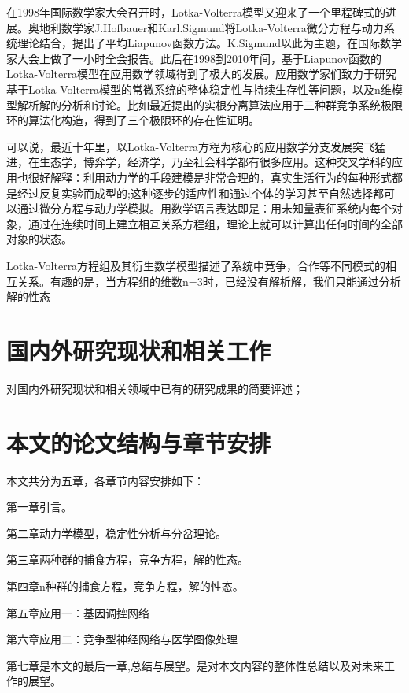 在1998年国际数学家大会召开时，Lotka-Volterra模型又迎来了一个里程碑式的进展。奥地利数学家J.Hofbauer和Karl.Sigmund将Lotka-Volterra微分方程与动力系统理论结合，提出了平均Liapunov函数方法。K.Sigmund以此为主题，在国际数学家大会上做了一小时全会报告。此后在1998到2010年间，基于Liapunov函数的Lotka-Volterra模型在应用数学领域得到了极大的发展。应用数学家们致力于研究基于Lotka-Volterra模型的常微系统的整体稳定性与持续生存性等问题，以及n维模型解析解的分析和讨论。比如最近提出的实根分离算法应用于三种群竞争系统极限环的算法化构造，得到了三个极限环的存在性证明。

可以说，最近十年里，以Lotka-Volterra方程为核心的应用数学分支发展突飞猛进，在生态学，博弈学，经济学，乃至社会科学都有很多应用。这种交叉学科的应用也很好解释：利用动力学的手段建模是非常合理的，真实生活行为的每种形式都是经过反复实验而成型的;这种逐步的适应性和通过个体的学习甚至自然选择都可以通过微分方程与动力学模拟。用数学语言表达即是：用未知量表征系统内每个对象，通过在连续时间上建立相互关系方程组，理论上就可以计算出任何时间的全部对象的状态。

Lotka-Volterra方程组及其衍生数学模型描述了系统中竞争，合作等不同模式的相互关系。有趣的是，当方程组的维数n=3时，已经没有解析解，我们只能通过分析解的性态

\section{国内外研究现状和相关工作}
\label{sec:related_work}
对国内外研究现状和相关领域中已有的研究成果的简要评述；
\section{本文的论文结构与章节安排}

\label{sec:arrangement}
本文共分为五章，各章节内容安排如下：

第一章引言。

第二章动力学模型，稳定性分析与分岔理论。

第三章两种群的捕食方程，竞争方程，解的性态。

第四章n种群的捕食方程，竞争方程，解的性态。

第五章应用一：基因调控网络

第六章应用二：竞争型神经网络与医学图像处理

第七章是本文的最后一章,总结与展望。是对本文内容的整体性总结以及对未来工作的展望。

